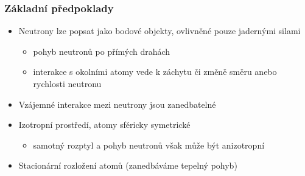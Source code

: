 \begin{frame}
  \frametitle{Základní předpoklady}
  
  \begin{itemize}
  	\item Neutrony lze popsat jako bodové objekty, ovlivněné pouze jadernými silami
  	\begin{itemize}
  		\item[\Rabullet] pohyb neutronů po přímých drahách
  		\item[\Rabullet] interakce s okolními atomy vede k záchytu či změně směru anebo rychlosti neutronu
  	\end{itemize}
  	\item Vzájemné interakce mezi neutrony jsou zanedbatelné
  	\item Izotropní prostředí, atomy sféricky symetrické
  	\begin{itemize}
  		\item samotný rozptyl a pohyb neutronů však může být anizotropní
  	\end{itemize}
  	\item Stacionární rozložení atomů (zanedbáváme tepelný pohyb)
  \end{itemize}

  
\end{frame}

